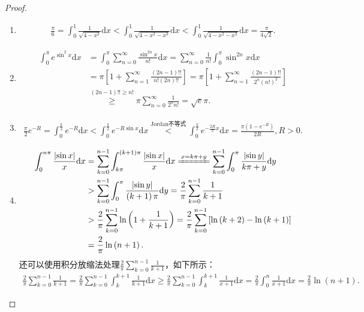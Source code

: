 \documentclass[../../main.tex]{subfiles}%
\begin{document}
\begin{proof}
\begin{enumerate}
\item \begin{align*}
\frac{\pi}{6}=\int_{0}^{1}\frac{1}{\sqrt{4 - x^{2}}}\mathrm{d}x < \int_{0}^{1}\frac{1}{\sqrt{4 - x^{2}-x^{3}}}\mathrm{d}x < \int_{0}^{1}\frac{1}{\sqrt{4 - x^{2}-x^{2}}}\mathrm{d}x=\frac{\pi}{4\sqrt{2}}.
\end{align*}

\item \begin{align*}
\int_0^{\pi}{e^{\sin ^2x}\mathrm{d}x}&=\int_0^{\pi}{\sum_{n=0}^{\infty}{\frac{\sin ^{2n}x}{n!}}\mathrm{d}x}=\sum_{n=0}^{\infty}{\frac{1}{n!}\int_0^{\pi}{\sin ^{2n}x\mathrm{d}x}}
\\
&=\pi \left[ 1+\sum_{n=1}^{\infty}{\frac{(2n-1)!!}{n!(2n)!!}} \right] =\pi \left[ 1+\sum_{n=1}^{\infty}{\frac{(2n-1)!!}{2^n\left( n! \right) ^2}} \right] 
\\
&\overset{(2n-1)!!\geqslant n!}{\geqslant}\pi \sum_{n=0}^{\infty}{\frac{1}{2^nn!}}=\sqrt{e}\pi .
\end{align*}

\item \begin{align*}
\frac{\pi}{2}e^{-R}=\int_{0}^{\frac{\pi}{2}}e^{-R}\mathrm{d}x < \int_{0}^{\frac{\pi}{2}}e^{-R\sin x}\mathrm{d}x\stackrel{\hyperref[theorem:Jordan不等式]{\text{Jordan不等式}}}{<}\int_{0}^{\frac{\pi}{2}}e^{-\frac{2R}{\pi}x}\mathrm{d}x=\frac{\pi(1 - e^{-R})}{2R}, R > 0.
\end{align*} 

\item \begin{align*}
\int_0^{n\pi}{\frac{\left| \sin x \right|}{x}\mathrm{d}x}&=\sum_{k=0}^{n-1}{\int_{k\pi}^{\left( k+1 \right) \pi}{\frac{\left| \sin x \right|}{x}\mathrm{d}x}}\xlongequal{x=k\pi +y}\sum_{k=0}^{n-1}{\int_0^{\pi}{\frac{\left| \sin y \right|}{k\pi +y}\mathrm{d}y}}
\\
&>\sum_{k=0}^{n-1}{\int_0^{\pi}{\frac{\left| \sin y \right|}{\left( k+1 \right) \pi}\mathrm{d}y}}=\frac{2}{\pi}\sum_{k=0}^{n-1}{\frac{1}{k+1}}
\\
&>\frac{2}{\pi}\sum_{k=0}^{n-1}{\ln \left( 1+\frac{1}{k+1} \right)}=\frac{2}{\pi}\sum_{k=0}^{n-1}{\left[ \ln \left( k+2 \right) -\ln \left( k+1 \right) \right]}
\\
&=\frac{2}{\pi}\ln \left( n+1 \right) .
\end{align*}
还可以使用积分放缩法处理$\frac{2}{\pi}\sum_{k=0}^{n-1}{\frac{1}{k+1}}$，如下所示：
\begin{align*}
\frac{2}{\pi}\sum_{k=0}^{n-1}{\frac{1}{k+1}}=\frac{2}{\pi}\sum_{k=0}^{n-1}{\int_k^{k+1}{\frac{1}{k+1}\mathrm{d}x}}\geqslant \frac{2}{\pi}\sum_{k=0}^{n-1}{\int_k^{k+1}{\frac{1}{x+1}\mathrm{d}x}}=\frac{2}{\pi}\int_0^n{\frac{1}{x+1}\mathrm{d}x}=\frac{2}{\pi}\ln \left( n+1 \right) .
\end{align*}
\end{enumerate}

\end{proof}
\end{document}
